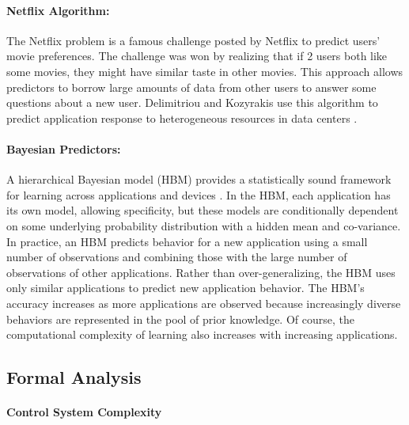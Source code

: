\paragraph{Netflix Algorithm:}
The Netflix problem is a famous challenge posted by Netflix to predict
users' movie preferences. The challenge was won by realizing that if 2
users both like some movies, they might have similar taste in other
movies. This approach allows predictors to borrow large amounts of
data from other users to answer some questions about a new user.
Delimitriou and Kozyrakis use this algorithm to predict application
response to heterogeneous resources in data centers
\cite{Paragon,quasar}.


\paragraph{ Bayesian Predictors:} A hierarchical Bayesian model (HBM)
provides a statistically sound framework for learning across
applications and devices \cite{LEO}.  In the HBM, each application has
its own model, allowing specificity, but these models are
conditionally dependent on some underlying probability distribution
with a hidden mean and co-variance.  In practice, an HBM predicts
behavior for a new application using a small number of observations
and combining those with the large number of observations of other
applications.  Rather than over-generalizing, the HBM uses only
similar applications to predict new application behavior.  The HBM's
accuracy increases as more applications are observed because
increasingly diverse behaviors are represented in the pool of prior
knowledge.  Of course, the computational complexity of learning also
increases with increasing applications.


\subsection{Formal Analysis}
\label{sec:guarantees}
\paragraph{Control System Complexity}

